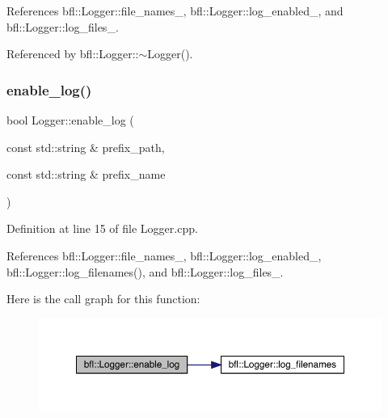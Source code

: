 References bfl\+::\+Logger\+::file\+\_\+names\+\_\+, bfl\+::\+Logger\+::log\+\_\+enabled\+\_\+, and bfl\+::\+Logger\+::log\+\_\+files\+\_\+.



Referenced by bfl\+::\+Logger\+::$\sim$\+Logger().

\mbox{\label{classbfl_1_1Logger_ae94b97b6e8d7902e8ce048384813122e}} 
\subsubsection{\texorpdfstring{enable\+\_\+log()}{enable\_log()}}
{\footnotesize\ttfamily bool Logger\+::enable\+\_\+log (\begin{DoxyParamCaption}\item[{const std\+::string \&}]{prefix\+\_\+path,  }\item[{const std\+::string \&}]{prefix\+\_\+name }\end{DoxyParamCaption})\hspace{0.3cm}{\ttfamily [inherited]}}



Definition at line 15 of file Logger.\+cpp.



References bfl\+::\+Logger\+::file\+\_\+names\+\_\+, bfl\+::\+Logger\+::log\+\_\+enabled\+\_\+, bfl\+::\+Logger\+::log\+\_\+filenames(), and bfl\+::\+Logger\+::log\+\_\+files\+\_\+.

Here is the call graph for this function\+:
\nopagebreak
\begin{figure}[H]
\begin{center}
\leavevmode
\includegraphics[width=350pt]{classbfl_1_1Logger_ae94b97b6e8d7902e8ce048384813122e_cgraph}
\end{center}
\end{figure}
\mbox{\label{classbfl_1_1MeasurementModel_a67ef096c5b3682252582aec75498089d}} 

